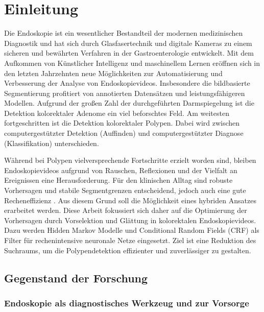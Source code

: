 \chapter{Einleitung}\label{ch:introduction}
Die Endoskopie ist ein wesentlicher Bestandteil der modernen medizinischen Diagnostik und hat sich durch Glasfasertechnik und digitale Kameras zu einem sicheren und bewährten Verfahren in der Gastroenterologie entwickelt. \cite{berci2000history} Mit dem Aufkommen von Künstlicher Intelligenz und maschinellem Lernen eröffnen sich in den letzten Jahrzehnten neue Möglichkeiten zur Automatisierung und Verbesserung der Analyse von Endoskopievideos. Insbesondere die bildbasierte Segmentierung profitiert von annotierten Datensätzen und leistungsfähigeren Modellen. Aufgrund der großen Zahl der durchgeführten Darmspiegelung ist die Detektion kolorektaler Adenome ein viel beforschtes Feld. Am weitesten fortgeschritten ist die Detektion kolorektaler Polypen. Dabei wird zwischen computergestützter Detektion (Auffinden) und computergestützter Diagnose (Klassifikation) unterschieden. \cite{okagawa2022artificial}

Während bei Polypen vielversprechende Fortschritte erzielt worden sind, bleiben Endoskopievideos aufgrund von Rauschen, Reflexionen und der Vielfalt an Ereignissen eine Herausforderung. \cite{giordano2025integration} Für den klinischen Alltag sind robuste Vorhersagen und stabile Segmentgrenzen entscheidend, jedoch auch eine gute Recheneffizienz \cite{Ali2020}. Aus diesem Grund soll die Möglichkeit eines hybriden Ansatzes erarbeitet werden. Diese Arbeit fokussiert sich daher auf die Optimierung der Vorhersagen durch Vorselektion und Glättung in kolorektalen Endoskopievideos. Dazu werden Hidden Markov Modelle  und Conditional Random Fields (CRF) als Filter für rechenintensive neuronale Netze eingesetzt. Ziel ist eine Reduktion des Suchraums, um die Polypendetektion effizienter und zuverlässiger zu gestalten.

\section{Gegenstand der Forschung}

\subsection{Endoskopie als diagnostisches Werkzeug und zur Vorsorge}

